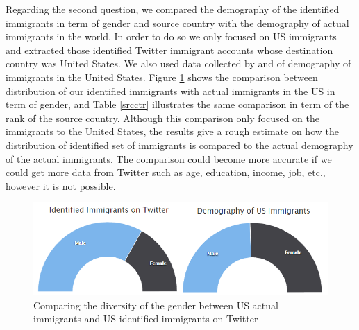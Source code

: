 \documentclass{article}
\begin{document}
Regarding the second question, we compared the demography of the identified immigrants in term of gender and source country with the demography of actual immigrants in the world. In order to do so we only focused on US immigrants and extracted those identified Twitter immigrant accounts whose destination country was United States. We also used data collected by \cite{ref22} and \cite{ref23} of demography of immigrants in the United States. Figure \ref{demography} shows the comparison between distribution of our identified immigrants with actual immigrants in the US in term of gender, and Table \ref{srcctr} illustrates the same comparison in term of the rank of the source country. Although this comparison only focused on the immigrants to the United States, the results give a rough estimate on how the distribution of identified set of immigrants is compared to the actual demography of the actual immigrants. The comparison could become more accurate if we could get more data from Twitter such as age, education, income, job, etc., however it is not possible. 

\begin{figure}[ht]
\vskip 0.2in
\begin{center}
\centerline{\includegraphics[width=\columnwidth]{Figures/Gender.png}}
\caption{Comparing the diversity of the gender between US actual immigrants and US identified immigrants on Twitter}
\label{demography}
\end{center}
\vskip -0.2in
\end{figure}
\end{document}
